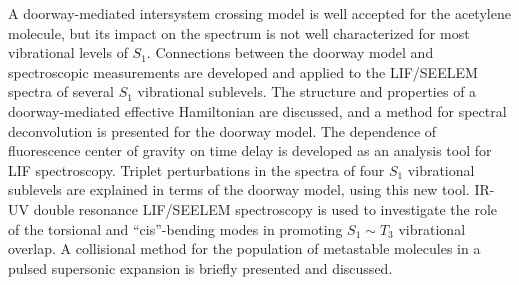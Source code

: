 % 
% 
%

A doorway-mediated intersystem crossing model is well accepted for the
acetylene molecule, but its impact on the spectrum is not well
characterized for most vibrational levels of $S_1$.  Connections
between the doorway model and spectroscopic measurements are developed
and applied to the LIF/SEELEM spectra of several $S_1$ vibrational
sublevels.  The structure and properties of a doorway-mediated
effective Hamiltonian are discussed, and a method for spectral
deconvolution is presented for the doorway model.  The dependence of
fluorescence center of gravity on time delay is developed as an
analysis tool for LIF spectroscopy.  Triplet perturbations in the
spectra of four $S_1$ vibrational sublevels are explained in terms of
the doorway model, using this new tool.  IR-UV double resonance
LIF/SEELEM spectroscopy is used to investigate the role of the
torsional and ``cis''-bending modes in promoting $S_1 \sim T_3$
vibrational overlap.  A collisional method for the population of
metastable molecules in a pulsed supersonic expansion is briefly
presented and discussed.


